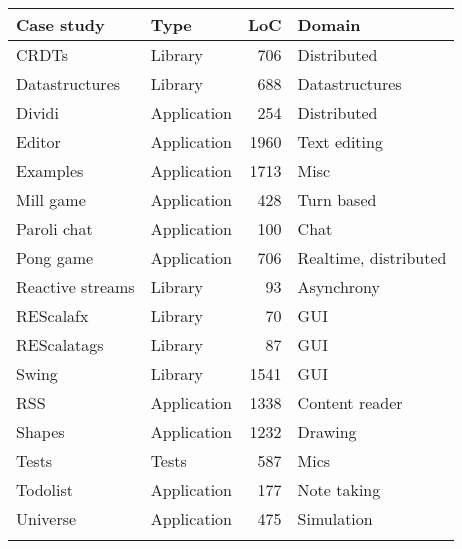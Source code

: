 \newcommand\columnname[1]{\textbf{#1}}
\small
\begin{tabular}{ll rl}
\toprule
\columnname{Case study} & \columnname{Type} & \columnname{LoC}& \columnname{Domain} \\ \midrule
CRDTs				&Library		&706	&Distributed\\
Datastructures		&Library		&688	&Datastructures\\
Dividi				&Application	&254	&Distributed\\
Editor				&Application	&1960	&Text editing\\
Examples			&Application	&1713	&Misc\\
Mill game			&Application	&428	&Turn based\\
Paroli chat			&Application	&100	&Chat\\
Pong game			&Application	&706	&Realtime, distributed\\
Reactive streams	&Library		&93		&Asynchrony\\
REScalafx			&Library		&70		&GUI\\
REScalatags			&Library		&87		&GUI\\
Swing				&Library		&1541	&GUI\\
RSS					&Application	&1338	&Content reader\\
Shapes				&Application	&1232	&Drawing\\
Tests				&Tests			&587	&Mics\\
Todolist			&Application	&177	&Note taking\\
Universe			&Application	&475	&Simulation\\
\bottomrule{}
\end{tabular}
